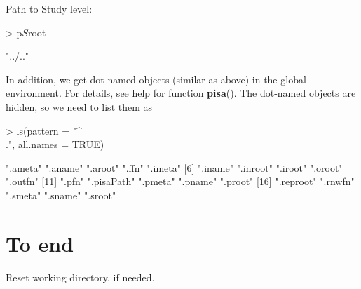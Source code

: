 \documentclass[a4paper,12pt]{article}\usepackage[]{graphicx}\usepackage[]{color}
\providecommand{\fct}[1]{{\ttfamily\textbf{#1}()}}
\begin{document}
Path to Study level:

\begin{Schunk}
\begin{Sinput}
> p$S$root
\end{Sinput}
\begin{Soutput}
[1] "../.."
\end{Soutput}
\end{Schunk}

In addition, we get  dot-named objects (similar as above) in the global environment. For details, see help for function \fct{pisa}. The dot-named objects are hidden, so we need to list them as

\begin{Schunk}
\begin{Sinput}
> ls(pattern = "^\\.", all.names = TRUE)
\end{Sinput}
\begin{Soutput}
 [1] ".ameta"    ".aname"    ".aroot"    ".ffn"      ".imeta"   
 [6] ".iname"    ".inroot"   ".iroot"    ".oroot"    ".outfn"   
[11] ".pfn"      ".pisaPath" ".pmeta"    ".pname"    ".proot"   
[16] ".reproot"  ".rnwfn"    ".smeta"    ".sname"    ".sroot"   
\end{Soutput}
\end{Schunk}


\clearpage
\section{To end}
Reset working directory, if needed.

\begin{Schunk}
\end{Schunk}


%
%

%
\end{document}
